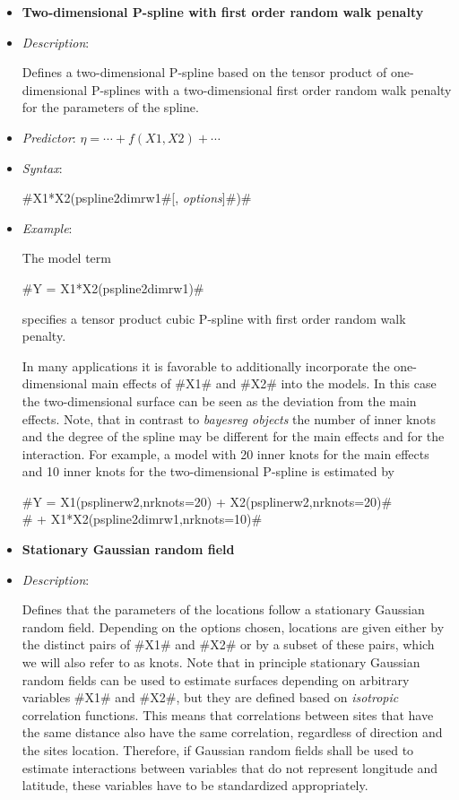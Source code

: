 \begin{itemize}
\item[]{\bf\sffamily Two-dimensional P-spline with first order
random walk penalty}

\item[] {\em Description}:

Defines a two-dimensional P-spline based on the tensor product of
one-dimensional P-splines with a two-dimensional first order
random walk penalty for the parameters of the spline. \item[] {\em
Predictor}: $\eta= \cdots + f(X1,X2) + \cdots$ \item[] {\em
Syntax}:

#X1*X2(pspline2dimrw1#[, {\em options}]#)#
\item[] {\em Example}:

The model term

#Y = X1*X2(pspline2dimrw1)#

specifies a tensor product cubic P-spline with first order random
walk penalty.

In many applications it is favorable to additionally incorporate
the one-dimensional main effects of #X1# and #X2# into the models.
In this case the two-dimensional surface can be seen as the
deviation from the main effects. Note, that in contrast to {\em
bayesreg objects} the number of inner knots and the degree of the
spline may be different for the main effects and for the
interaction. For example, a model with 20 inner knots for the main
effects and 10 inner knots for the two-dimensional P-spline is
estimated by

 #Y = X1(psplinerw2,nrknots=20) + X2(psplinerw2,nrknots=20)#\\
 #    + X1*X2(pspline2dimrw1,nrknots=10)#

\item[]{\bf\sffamily Stationary Gaussian random field}

\item[] {\em Description}:

Defines that the parameters of the locations follow a stationary
Gaussian random field. Depending on the options chosen, locations
are given either by the distinct pairs of #X1# and #X2# or by a
subset of these pairs, which we will also refer to as knots. Note
that in principle stationary Gaussian random fields can be used to
estimate surfaces depending on arbitrary variables #X1# and #X2#,
but they are defined based on {\em isotropic} correlation
functions. This means that correlations between sites that have
the same distance also have the same correlation, regardless of
direction and the sites location. Therefore, if Gaussian random
fields shall be used to estimate interactions between variables
that do not represent longitude and latitude, these variables have
to be standardized appropriately.


\end{itemize}
